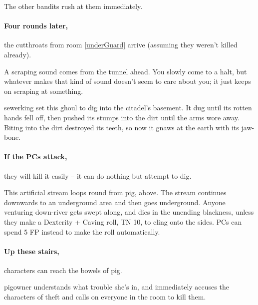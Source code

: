 \begin{multicols}{2}
The other bandits rush at them immediately.

\sewerking


\paragraph{Four rounds later,}
the cutthroats from room \ref{underGuard} arrive (assuming they weren't killed already).


\begin{boxtext}
  A scraping sound comes from the tunnel ahead.
  You slowly come to a halt, but whatever makes that kind of sound doesn't seem to care about you; it just keeps on scraping at something.
\end{boxtext}
 
\begin{exampletext}
  \Gls{sewerking} set this ghoul to dig into the citadel's basement.
  It dug until its rotten hands fell off, then pushed its stumps into the dirt until the arms wore away.
  Biting into the dirt destroyed its teeth, so now it gnaws at the earth with its jaw-bone.
\end{exampletext}

\paragraph{If the PCs attack,}
they will kill it easily -- it can do nothing but attempt to dig.

\label{slidein}

This artificial stream loops round from \gls{pig}, above.
The stream continues downwards to an underground area and then goes underground.
Anyone venturing down-river gets swept along, and dies in the unending blackness, unless they make a Dexterity + Caving roll, TN 10, to cling onto the sides.
PCs can spend 5 FP instead to make the roll automatically.


\paragraph{Up these stairs,}
characters can reach the bowels of \gls{pig}.

\Gls{pigowner} understands what trouble she's in, and immediately accuses the characters of theft and calls on everyone in the room to kill them.


\end{multicols}
